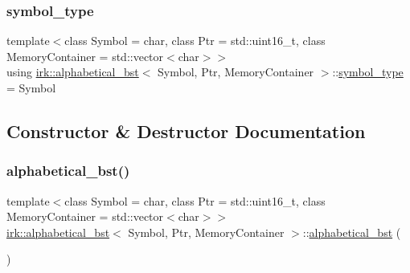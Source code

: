 \mbox{\label{classirk_1_1alphabetical__bst_a296ccb8fa9fa9dce3b3c3beab0a5ca28}} 
\subsubsection{\texorpdfstring{symbol\+\_\+type}{symbol\_type}}
{\footnotesize\ttfamily template$<$class Symbol = char, class Ptr = std\+::uint16\+\_\+t, class Memory\+Container = std\+::vector$<$char$>$$>$ \\
using \mbox{\hyperlink{classirk_1_1alphabetical__bst}{irk\+::alphabetical\+\_\+bst}}$<$ Symbol, Ptr, Memory\+Container $>$\+::\mbox{\hyperlink{classirk_1_1alphabetical__bst_a296ccb8fa9fa9dce3b3c3beab0a5ca28}{symbol\+\_\+type}} =  Symbol}



\subsection{Constructor \& Destructor Documentation}
\mbox{\label{classirk_1_1alphabetical__bst_aa4c4b01aac537a6cf70dba71002e1f7d}} 
\subsubsection{\texorpdfstring{alphabetical\+\_\+bst()}{alphabetical\_bst()}\hspace{0.1cm}{\footnotesize\ttfamily [1/2]}}
{\footnotesize\ttfamily template$<$class Symbol = char, class Ptr = std\+::uint16\+\_\+t, class Memory\+Container = std\+::vector$<$char$>$$>$ \\
\mbox{\hyperlink{classirk_1_1alphabetical__bst}{irk\+::alphabetical\+\_\+bst}}$<$ Symbol, Ptr, Memory\+Container $>$\+::\mbox{\hyperlink{classirk_1_1alphabetical__bst}{alphabetical\+\_\+bst}} (\begin{DoxyParamCaption}{ }\end{DoxyParamCaption})\hspace{0.3cm}{\ttfamily [default]}}

